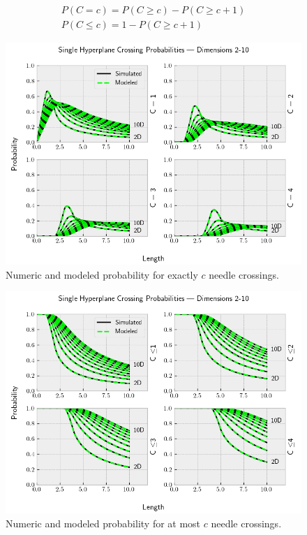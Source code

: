 \documentclass{article}
\begin{document}
\begin{gather}
	P(C=c) = P(C\ge c) - P(C\ge c+1) \\
	P(C\le c) = 1 - P(C\ge c+1)
\end{gather}

\begin{figure}
	\centerline{\includegraphics[width=5in]{numeric_sim_N1_e.png}}
	\caption{Numeric and modeled probability for exactly $c$ needle crossings.}
	\label{fig:numeric sim N1 e}
\end{figure}

\begin{figure}
	\centerline{\includegraphics[width=5in]{numeric_sim_N1_le.png}}
	\caption{Numeric and modeled probability for at most $c$ needle crossings.}
	\label{fig:numeric sim N1 le}
\end{figure}
\end{document}
